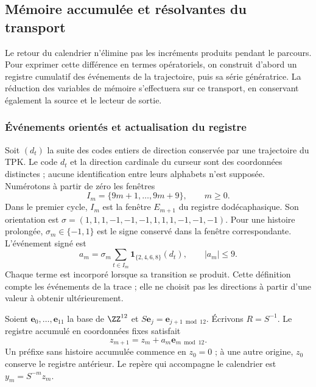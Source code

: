 \subsection{Mémoire accumulée et résolvantes du transport}
\label{subsec:memoria-resolvente}

Le retour du calendrier n'élimine pas les incréments produits pendant
le parcours. Pour exprimer cette différence en termes opératoriels, on construit
d'abord un registre cumulatif des événements de la trajectoire, puis sa
série génératrice. La réduction des variables de mémoire s'effectuera sur
ce transport, en conservant également la source et le lecteur de sortie.

\subsubsection{Événements orientés et actualisation du registre}

Soit \((d_t)\) la suite des codes entiers de direction conservée
par une trajectoire du TPK. Le code \(d_t\) et la direction cardinale
du curseur sont des coordonnées distinctes ; aucune identification
entre leurs alphabets n'est supposée. Numérotons à partir de zéro les fenêtres
\[
 I_m=\{9m+1,\ldots,9m+9\},\qquad m\geq0.
\]
Dans le premier cycle, \(I_m\) est la fenêtre \(E_{m+1}\) du registre
dodécaphasique. Son orientation est
\(\sigma=(1,1,1,-1,-1,-1,1,1,1,-1,-1,-1)\).
Pour une histoire prolongée, \(\sigma_m\in\{-1,1\}\) est le signe
conservé dans la fenêtre correspondante. L'événement signé est
\begin{equation}
 a_m=\sigma_m\sum_{t\in I_m}
       \mathbf1_{\{2,4,6,8\}}(d_t),\qquad |a_m|\leq9.
 \label{mem:evento}
\end{equation}
Chaque terme est incorporé lorsque sa transition se produit. Cette définition
compte les événements de la trace ; elle ne choisit pas les directions à partir d'une valeur
à obtenir ultérieurement.

Soient \(\mathbf e_0,\ldots,\mathbf e_{11}\) la base de \(\ZZ^{12}\)
et \(S\mathbf e_j=\mathbf e_{j+1\bmod12}\). Écrivons
\(R=S^{-1}\). Le registre accumulé en coordonnées fixes satisfait
\[
z_{m+1}=z_m+a_m\mathbf e_{m\bmod12}.
\]
Un préfixe sans histoire accumulée commence en \(z_0=0\) ; à une autre
origine, \(z_0\) conserve le registre antérieur.
Le repère qui accompagne le calendrier est \(y_m=S^{-m}z_m\).

